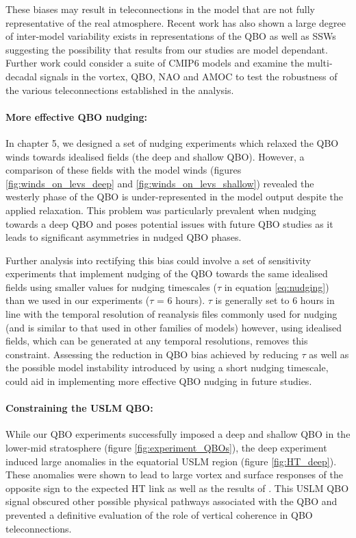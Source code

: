 These biases may result in teleconnections in the model that are not fully representative of the real atmosphere. Recent work has also shown a large degree of inter-model variability exists in representations of the QBO \citep{bushellEvaluation2020b} as well as SSWs \citep{ayarzaguenaUncertainty2020b} suggesting the possibility that results from our studies are model dependant. Further work could consider a suite of CMIP6 models and examine the multi-decadal signals in the vortex, QBO, NAO and AMOC to test the robustness of the various teleconnections established in the analysis.   

\paragraph{More effective QBO nudging:}
In chapter 5, we designed a set of nudging experiments which relaxed the QBO winds towards idealised fields (the deep and shallow QBO). However, a comparison of these fields with the model winds (figures \ref{fig:winds_on_levs_deep} and \ref{fig:winds_on_levs_shallow}) revealed the westerly phase of the QBO is under-represented in the model output despite the applied relaxation. This problem was particularly prevalent when nudging towards a deep QBO and poses potential issues with future QBO studies as it leads to significant asymmetries in nudged QBO phases.

Further analysis into rectifying this bias could involve a set of sensitivity experiments that implement nudging of the QBO towards the same idealised fields using smaller values for nudging timescales ($\tau$ in equation \ref{eq:nudging}) than we used in our experiments ($\tau$ = 6 hours). $\tau$ is generally set to 6 hours in line with the temporal resolution of reanalysis files commonly used for nudging (and is similar to that used in other families of models) \citep{telfordTechnical2008} however, using idealised fields, which can be generated at any temporal resolutions, removes this constraint. Assessing the reduction in QBO bias achieved by reducing $\tau$ as well as the possible model instability introduced by using a short nudging timescale, could aid in implementing more effective QBO nudging in future studies.

\paragraph{Constraining the USLM QBO:}
While our QBO experiments successfully imposed a deep and shallow QBO in the lower-mid stratosphere (figure \ref{fig:experiment_QBOs}), the deep experiment induced large anomalies in the equatorial USLM region (figure \ref{fig:HT_deep}). These anomalies were shown to lead to large vortex and surface responses of the opposite sign to the expected HT link as well as the results of \cite{andrewsObserved2019d}. This USLM QBO signal obscured other possible physical pathways associated with the QBO and prevented a definitive evaluation of the role of vertical coherence in QBO teleconnections. 


